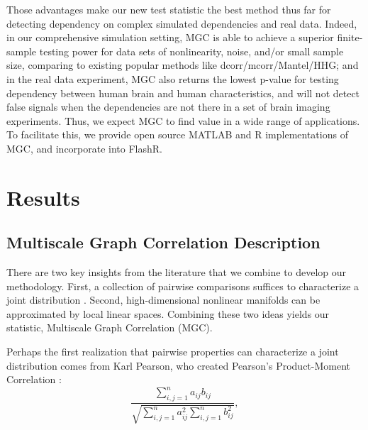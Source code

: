 \documentclass[11pt]{article}
\begin{document}
Those advantages make our new test statistic the best method thus far for detecting dependency on complex simulated dependencies and real data. Indeed, in our comprehensive simulation setting, MGC is able to achieve a superior finite-sample testing power for data sets of nonlinearity, noise, and/or small sample size, comparing to existing popular methods like dcorr/mcorr/Mantel/HHG; and in the real data experiment, MGC also returns the lowest p-value for testing dependency between human brain and human characteristics,  and will not detect false signals when the dependencies are not there in a set of brain imaging experiments. Thus, we expect MGC to find value in a wide range of applications.  To facilitate this, we provide open source MATLAB and R implementations of MGC, and incorporate into FlashR.

\section{Results}
\label{main}
\subsection{Multiscale Graph Correlation Description}
\label{main1}
There are two key insights from the literature that we combine to develop our methodology.  First, a collection of pairwise comparisons  suffices to characterize a joint distribution \cite{Maa1996}.  Second, high-dimensional nonlinear manifolds can be approximated by local linear spaces.  Combining these two ideas yields our statistic,  Multiscale Graph Correlation (MGC).  

Perhaps the first realization that pairwise properties can characterize a joint distribution comes from  Karl Pearson, who created Pearson's Product-Moment Correlation \cite{Pearson1895}:
\begin{equation}
\label{generalCoef}
\frac{\sum_{i,j=1}^n a_{ij} b_{ij}}{\sqrt{\sum_{i,j=1}^n  a_{ij}^{2} \sum_{i,j=1}^n b_{ij}^{2}}}, 
\end{equation}
\end{document}
